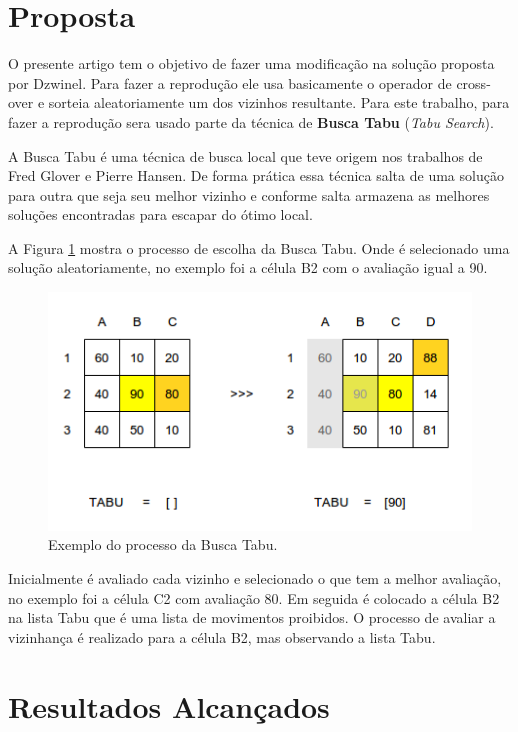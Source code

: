 \documentclass[12pt]{article}
\begin{document}
\section{Proposta}

O presente artigo tem o objetivo de fazer uma modificação na solução proposta
por Dzwinel. Para fazer a reprodução ele usa basicamente o operador de cross-
over e sorteia aleatoriamente um dos vizinhos resultante. Para este trabalho, 
para fazer a reprodução sera usado parte da técnica de \textbf{Busca Tabu}
(\textit{Tabu Search}).

A Busca Tabu é uma técnica de busca local que teve origem nos trabalhos de
Fred Glover e Pierre Hansen. De forma prática essa técnica salta de uma
solução para outra que seja seu melhor vizinho e conforme salta armazena as
melhores soluções encontradas para escapar do ótimo local.

A Figura \ref{fig:busca-tabu} mostra o processo de escolha da Busca Tabu.
Onde é selecionado uma solução aleatoriamente, no exemplo foi a célula B2 com
o avaliação igual a 90.

\begin{figure}[h!]
\centering
\includegraphics[width=.5\textwidth]{imagens/busca-tabu}
\caption{Exemplo do processo da Busca Tabu.}
\label{fig:busca-tabu}
\end{figure}

Inicialmente é avaliado cada vizinho e selecionado o que tem a melhor
avaliação, no exemplo foi a célula C2 com avaliação 80. Em seguida é colocado
a célula B2 na lista Tabu que é uma lista de movimentos proibidos. O processo
de avaliar a vizinhança é realizado para a célula B2, mas observando a lista
Tabu.


\section{Resultados Alcançados}
\end{document}
